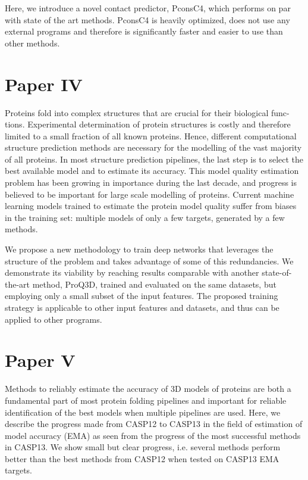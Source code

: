Here, we introduce a novel contact predictor, PconsC4, which performs on par with state of the art methods. PconsC4 is heavily optimized, does not use any external programs and therefore is significantly faster and easier to use than other methods.

\section*{Paper IV}
 Proteins fold into complex structures that are crucial for their biological func-
tions. Experimental determination of protein structures is costly and therefore limited to a small
fraction of all known proteins. Hence, different computational structure prediction methods are
necessary for the modelling of the vast majority of all proteins. In most structure prediction
pipelines, the last step is to select the best available model and to estimate its accuracy. This
model quality estimation problem has been growing in importance during the last decade, and
progress is believed to be important for large scale modelling of proteins.
Current machine learning models trained to estimate the protein model quality suffer from
biases in the training set: multiple models of only a few targets, generated by a few methods.

 We propose a new methodology to train deep networks that leverages the structure of
the problem and takes advantage of some of this redundancies. We demonstrate its viability by
reaching results comparable with another state-of-the-art method, ProQ3D, trained and evaluated
on the same datasets, but employing only a small subset of the input features.
The proposed training strategy is applicable to other input features and datasets, and thus can
be applied to other programs.


\section*{Paper V}

Methods to reliably estimate the accuracy of 3D models of proteins are both a fundamental part
of most protein folding pipelines and important for reliable identification of the best models when
multiple pipelines are used. Here, we describe the progress made from CASP12 to CASP13 in
the field of estimation of model accuracy (EMA) as seen from the progress of the most
successful methods in CASP13. We show small but clear progress, i.e. several methods
perform better than the best methods from CASP12 when tested on CASP13 EMA targets.